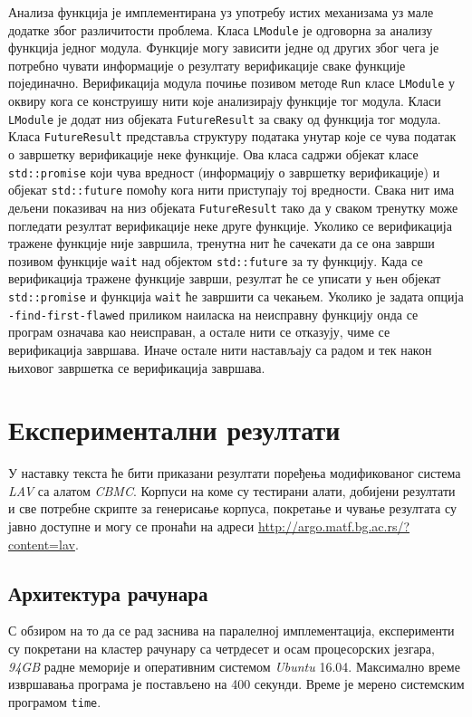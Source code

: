 \documentclass[12pt,oneside]{memoir}
\begin{document}
Анализа функција је имплементирана уз употребу истих механизама уз мале додатке због различитости проблема.   
 Класа \texttt{LModule} је одговорна за анализу функција једног модула. Функције могу зависити једне од других због чега је потребно чувати информације о резултату верификације сваке функције појединачно. Верификација модула почиње позивом методе \texttt{Run} класе \texttt{LModule} у оквиру кога се конструишу нити које анализирају функције тог модула. Класи \texttt{LModule} је додат низ објеката \texttt{FutureResult} за сваку од функција тог модула. Класа \texttt{FutureResult} представља структуру података унутар које се чува податак о завршетку верификације неке функције. Ова класа садржи објекат класе \texttt{std::promise}  који чува вредност (информацију о завршетку верификације) и објекат \texttt{std::future} помоћу кога нити приступају тој вредности. Свака нит има дељени показивач на низ објеката \texttt{FutureResult} тако да у сваком тренутку може погледати резултат верификације неке друге функције. Уколико се верификација тражене функције није завршила, тренутна нит ће сачекати да се она заврши позивом функције \texttt{wait} над објектом \texttt{std::future} за ту функцију. Када се верификација тражене функције заврши, резултат ће се уписати у њен објекат \texttt{std::promise} и функција \texttt{wait} ће завршити са чекањем. Уколико је задата опција \texttt{-find-first-flawed} приликом наиласка на неисправну функцију онда се програм означава као неисправан, а остале нити се отказују, чиме се верификација завршава. Иначе остале нити настављају са радом и тек након њиховог завршетка се верификација завршава.

\chapter{Експериментални резултати} \label{rezultati}

У наставку текста ће бити приказани резултати поређења модификованог система \textit{LAV} са алатом \textit{CBMC}. Корпуси на коме су тестирани алати, добијени резултати и све потребне скрипте за генерисање корпуса, покретање и чување резултата су јавно доступне и могу се пронаћи на адреси \url{http://argo.matf.bg.ac.rs/?content=lav}.


  \section{Архитектура рачунара}
  
  С обзиром на то да се рад заснива на паралелној имплементација, експерименти су покретани на кластер рачунару са четрдесет и осам процесорских језгара, \textit{94GB} радне меморије и оперативним системом \textit{Ubuntu} 16.04. Максимално време извршавања програма је постављено на 400 секунди. Време је мерено системским програмом \texttt{time}.
  
\end{document}
